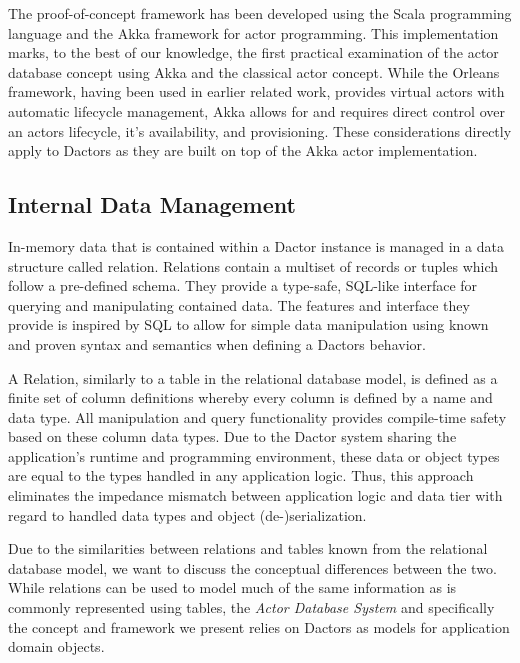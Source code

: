 The proof-of-concept framework has been developed using the Scala programming language and the Akka framework for actor programming.
This implementation marks, to the best of our knowledge, the first practical examination of the actor database concept using Akka and the classical actor concept.
While the Orleans framework, having been used in earlier related work, provides virtual actors with automatic lifecycle management, Akka allows for and requires direct control over an actors lifecycle, it's availability, and provisioning.
These considerations directly apply to Dactors as they are built on top of the Akka actor implementation.

\subsection{Internal Data Management}

In-memory data that is contained within a Dactor instance is managed in a data structure called relation.
Relations contain a multiset of records or tuples which follow a pre-defined schema.
They provide a type-safe, SQL-like interface for querying and manipulating contained data.
The features and interface they provide is inspired by SQL to allow for simple data manipulation using known and proven syntax and semantics when defining a Dactors behavior.

A Relation, similarly to a table in the relational database model, is defined as a finite set of column definitions whereby every column is defined by a name and data type.
All manipulation and query functionality provides compile-time safety based on these column data types.
Due to the Dactor system sharing the application's runtime and programming environment, these data or object types are equal to the types handled in any application logic.
Thus, this approach eliminates the impedance mismatch between application logic and data tier with regard to handled data types and object (de-)serialization.

Due to the similarities between relations and tables known from the relational database model, we want to discuss the conceptual differences between the two.
While relations can be used to model much of the same information as is commonly represented using tables, the \textit{Actor Database System} and specifically the concept and framework we present relies on Dactors as models for application domain objects.

